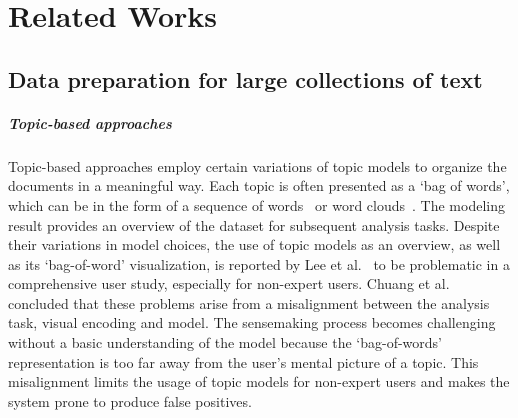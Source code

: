 \section{Related Works}
\subsection{Data preparation for large collections of text}
\subparagraph{Topic-based approaches} 
Topic-based approaches employ certain variations of topic models to organize the documents in a meaningful way.
Each topic is often presented as a `bag of words', which can be in the form of a sequence of words~\cite{yang2017vistopic, cho2016vairoma, dou2013hierarchicaltopics,yan2019clfsemi,han2022hisva, alexander2014serendip, lee2012ivisclustering} or word clouds~\cite{oelke2014topiccoin, cho2016vairoma}.
The modeling result provides an overview of the dataset for subsequent analysis tasks. 
Despite their variations in model choices, the use of topic models as an overview, as well as its `bag-of-word' visualization, is reported by Lee et al.~\cite{lee2017humantopicmodel} to be problematic in a comprehensive user study, especially for non-expert users.
Chuang et al.~\cite{chuang2012interpretation} concluded that these problems arise from a misalignment between the analysis task, visual encoding and model.
The sensemaking process becomes challenging without a basic understanding of the model because the `bag-of-words' representation is too far away from the user's mental picture of a topic.
This misalignment limits the usage of topic models for non-expert users and makes the system prone to produce false positives.

